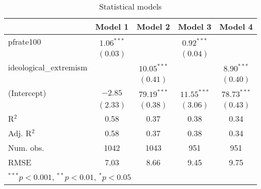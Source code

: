 \documentclass[12pt]{article}
\begin{document}
\begin{table}
	\begin{center}
		\begin{tabular}{l c c c c }
			\hline
			& Model 1 & Model 2 & Model 3 & Model 4 \\
			\hline
			pfrate100              & $1.06^{***}$ &               & $0.92^{***}$  &               \\
			& $(0.03)$     &               & $(0.04)$      &               \\
			ideological\_extremism &              & $10.05^{***}$ &               & $8.90^{***}$  \\
			&              & $(0.41)$      &               & $(0.40)$      \\
			(Intercept)            & $-2.85$      & $79.19^{***}$ & $11.55^{***}$ & $78.73^{***}$ \\
			& $(2.33)$     & $(0.38)$      & $(3.06)$      & $(0.43)$      \\
			\hline
			R$^2$                  & 0.58         & 0.37          & 0.38          & 0.34          \\
			Adj. R$^2$             & 0.58         & 0.37          & 0.38          & 0.34          \\
			Num. obs.              & 1042         & 1043          & 951           & 951           \\
			RMSE                   & 7.03         & 8.66          & 9.45          & 9.75          \\
			\hline
			\multicolumn{5}{l}{\scriptsize{$^{***}p<0.001$, $^{**}p<0.01$, $^*p<0.05$}}
		\end{tabular}
		\caption{Statistical models}
		\label{table:coefficients}
	\end{center}
\end{table}
\end{document}
